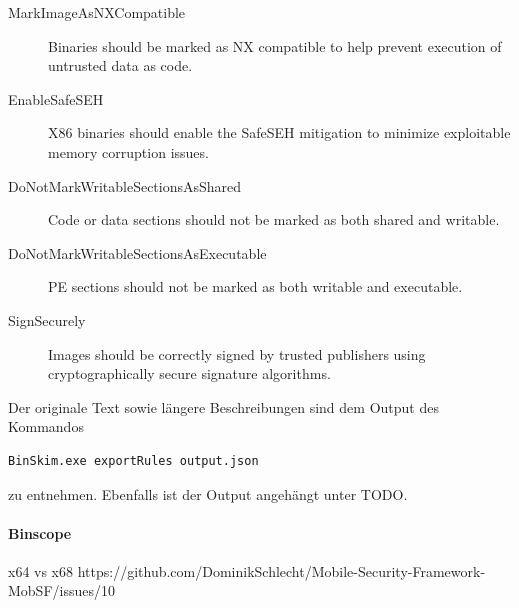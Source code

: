 \begin{description}
	\item[MarkImageAsNXCompatible] Binaries should be marked as NX compatible to help prevent execution of untrusted data as code.
	\item[EnableSafeSEH] X86 binaries should enable the SafeSEH mitigation to minimize exploitable memory corruption issues.
	\item[DoNotMarkWritableSectionsAsShared] Code or data sections should not be marked as both shared and writable.
	\item[DoNotMarkWritableSectionsAsExecutable] PE sections should not be marked as both writable and executable.
	\item[SignSecurely] Images should be correctly signed by trusted publishers using cryptographically secure signature algorithms.
\end{description}

Der originale Text sowie längere Beschreibungen sind dem Output des Kommandos
\begin{lstlisting}
BinSkim.exe exportRules output.json
\end{lstlisting}
zu entnehmen. Ebenfalls ist der Output angehängt unter TODO.

\paragraph{Binscope}
x64 vs x68
https://github.com/DominikSchlecht/Mobile-Security-Framework-MobSF/issues/10

